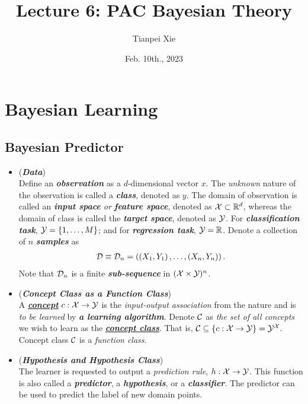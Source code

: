\documentclass[11pt]{article}
\begin{document}
\title{Lecture 6: PAC Bayesian Theory}
\author{ Tianpei Xie}
\date{Feb. 10th., 2023}
\maketitle
\tableofcontents
\newpage
\section{Bayesian Learning}
\subsection{Bayesian Predictor}
\begin{itemize}
\item \begin{remark} (\emph{\textbf{Data}})\\
Define an \emph{\textbf{observation}} as a $d$-dimensional vector $x$. The \emph{unknown} nature of the observation is called a \emph{\textbf{class}}, denoted as $y$. The domain of observation is called an \emph{\textbf{input space} or \textbf{feature space}}, denoted as ${\mathcal X}\subset {\mathbb R}^{d}$, whereas the domain of class is called the \emph{\textbf{target space}}, denoted as ${\mathcal Y}$. For \emph{\textbf{classification task}}, ${\mathcal Y}= \left\{1,\ldots, M\right\}$; and for \emph{\textbf{regression task}}, ${\mathcal Y} = {\mathbb R}$. 
Denote a collection of $n$ \emph{\textbf{samples}} as 
\begin{align*}
{\mathcal D} \equiv {\mathcal D}_n = \left((X_1, Y_1) \,{,}\ldots{,}\, (X_n, Y_n)\right).
\end{align*} Note that ${\mathcal D}_n$ is a finite \emph{\textbf{sub-sequence}} in $({\mathcal X} \times {\mathcal Y})^n$.
\end{remark}


\item \begin{definition} (\emph{\textbf{Concept Class as a Function Class}})\\
 A \underline{\emph{\textbf{concept}}} $c: {\mathcal X} \rightarrow {\mathcal Y}$ is the \emph{input-output association} from the nature and is \emph{to be learned} by \emph{\textbf{a learning algorithm}}.  Denote ${\mathcal C}$ as \emph{the set of all concepts} we wish to learn as the \underline{\emph{\textbf{concept class}}}. That is, ${\mathcal C} \subseteq \left\{c: {\mathcal X} \rightarrow {\mathcal Y} \right\} ={\mathcal Y}^{{\mathcal X}}.$ Concept class ${\mathcal C}$ is a \emph{function class}. 
\end{definition}

\item \begin{definition} (\emph{\textbf{Hypothesis and Hypothesis Class}})\\
The learner is requested to output a \emph{prediction rule}, $h : {\mathcal X} \to {\mathcal Y}$. This function is also called a \emph{\textbf{predictor}}, a \emph{\textbf{hypothesis}}, or a \emph{\textbf{classifier}}. The predictor can be used to predict the label of new domain points. 


\end{definition}
\end{itemize}
\end{document}
